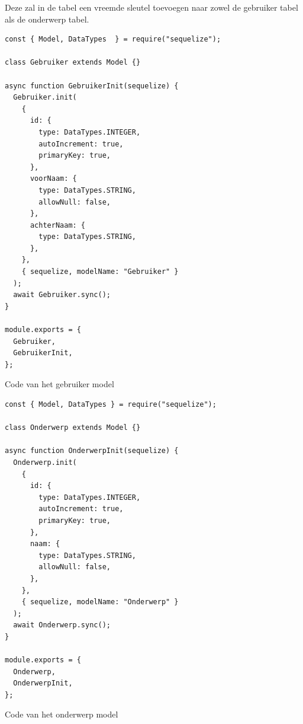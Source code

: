 Deze zal in de tabel een vreemde sleutel toevoegen naar zowel de gebruiker tabel als de onderwerp tabel. 
\begin{listing}[H]
  \centering
  \begin{verbatim}
const { Model, DataTypes  } = require("sequelize");

class Gebruiker extends Model {}

async function GebruikerInit(sequelize) {
  Gebruiker.init(
    {
      id: {
        type: DataTypes.INTEGER,
        autoIncrement: true,
        primaryKey: true,
      },
      voorNaam: {
        type: DataTypes.STRING,
        allowNull: false,
      },
      achterNaam: {
        type: DataTypes.STRING,
      },
    },
    { sequelize, modelName: "Gebruiker" }
  );
  await Gebruiker.sync();
}

module.exports = {
  Gebruiker,
  GebruikerInit,
};
\end{verbatim}
\caption{\label{code:User}Code van het gebruiker model}
\end{listing}

\begin{listing}[H]
  \centering
  \begin{verbatim}
const { Model, DataTypes } = require("sequelize");

class Onderwerp extends Model {}

async function OnderwerpInit(sequelize) {
  Onderwerp.init(
    {
      id: {
        type: DataTypes.INTEGER,
        autoIncrement: true,
        primaryKey: true,
      },
      naam: {
        type: DataTypes.STRING,
        allowNull: false,
      },
    },
    { sequelize, modelName: "Onderwerp" }
  );
  await Onderwerp.sync();
}

module.exports = {
  Onderwerp,
  OnderwerpInit,
};
\end{verbatim}
\caption{\label{code:Subject}Code van het onderwerp model}
\end{listing}

